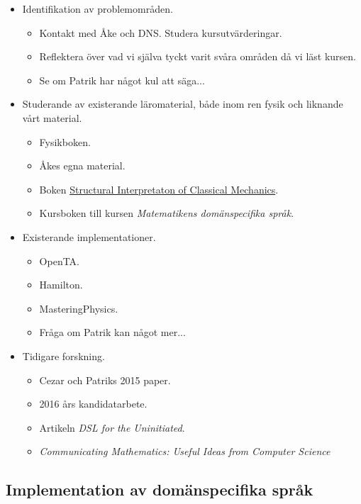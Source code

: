 \documentclass[12pt,a4paper]{scrartcl}
\begin{document}
\begin{itemize}
    \item Identifikation av problemområden.
        \begin{itemize}
            \item Kontakt med Åke och DNS. Studera kursutvärderingar.
            \item Reflektera över vad vi själva tyckt varit svåra områden då vi läst kursen.
            \item Se om Patrik har något kul att säga...
        \end{itemize}
    \item Studerande av existerande läromaterial, både inom ren fysik och liknande vårt material.
        \begin{itemize}
            \item Fysikboken.
            \item Åkes egna material.
            \item Boken \href{http://case.edu/artsci/math/wells/pub/pdf/commath.pdf}{Structural Interpretaton of Classical Mechanics}.
            \item Kursboken till kursen \textit{Matematikens domänspecifika språk}.
        \end{itemize}
    \item Existerande implementationer.
        \begin{itemize}
            \item OpenTA.
            \item Hamilton.
            \item MasteringPhysics.
            \item Fråga om Patrik kan något mer...
        \end{itemize}
    \item Tidigare forskning.
        \begin{itemize}
            \item Cezar och Patriks 2015 paper.
            \item 2016 års kandidatarbete.
            \item Artikeln \textit{DSL for the Uninitiated}.
            \item \textit{Communicating Mathematics: Useful Ideas from Computer Science}
        \end{itemize}
\end{itemize}

\subsection{Implementation av domänspecifika språk}
\end{document}
